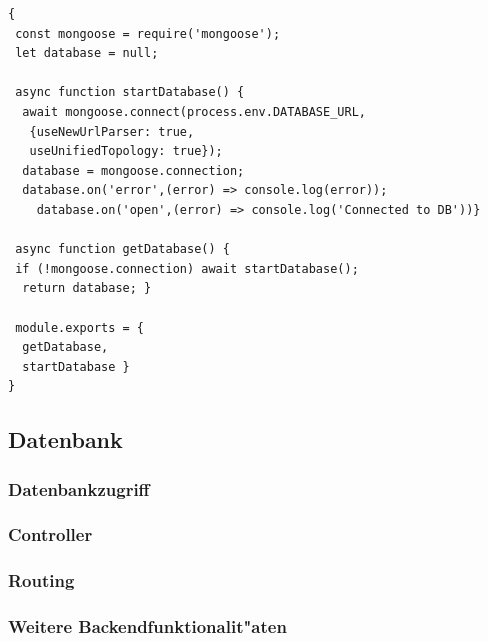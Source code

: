 \begin{lstlisting}[caption=Verbindung zur MongoDB-Datenbank, label=lst:mongodbconnection]
{
 const mongoose = require('mongoose');
 let database = null;

 async function startDatabase() {
  await mongoose.connect(process.env.DATABASE_URL, 
   {useNewUrlParser: true,
   useUnifiedTopology: true}); 
  database = mongoose.connection;
  database.on('error',(error) => console.log(error));
  	database.on('open',(error) => console.log('Connected to DB'))}

 async function getDatabase() {
 if (!mongoose.connection) await startDatabase();
  return database; }

 module.exports = {
  getDatabase,
  startDatabase }
}
\end{lstlisting}

\subsection{Datenbank}


\subsubsection{Datenbankzugriff}                   


\subsubsection{Controller} 



\subsubsection{Routing} 


\subsubsection{Weitere Backendfunktionalit"aten} 


